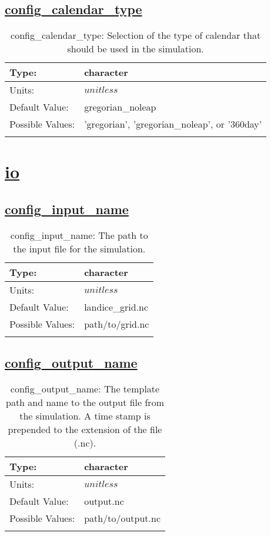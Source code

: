 \subsection[config\_calendar\_type]{\hyperref[sec:nm_tab_time_management]{config\_calendar\_type}}
\label{subsec:nm_sec_config_calendar_type}
\begin{center}
\begin{longtable}{| p{2.0in} | p{4.0in} |}
    \hline
    Type: & character \\
    \hline
    Units: & $unitless$ \\
    \hline
    Default Value: & gregorian\_noleap \\
    \hline
    Possible Values: & 'gregorian', 'gregorian\_noleap', or '360day' \\
    \hline
    \caption{config\_calendar\_type: Selection of the type of calendar that should be used in the simulation.}
\end{longtable}
\end{center}
\section[io]{\hyperref[sec:nm_tab_io]{io}}
\label{sec:nm_sec_io}
\subsection[config\_input\_name]{\hyperref[sec:nm_tab_io]{config\_input\_name}}
\label{subsec:nm_sec_config_input_name}
\begin{center}
\begin{longtable}{| p{2.0in} | p{4.0in} |}
    \hline
    Type: & character \\
    \hline
    Units: & $unitless$ \\
    \hline
    Default Value: & landice\_grid.nc \\
    \hline
    Possible Values: & path/to/grid.nc \\
    \hline
    \caption{config\_input\_name: The path to the input file for the simulation.}
\end{longtable}
\end{center}
\subsection[config\_output\_name]{\hyperref[sec:nm_tab_io]{config\_output\_name}}
\label{subsec:nm_sec_config_output_name}
\begin{center}
\begin{longtable}{| p{2.0in} | p{4.0in} |}
    \hline
    Type: & character \\
    \hline
    Units: & $unitless$ \\
    \hline
    Default Value: & output.nc \\
    \hline
    Possible Values: & path/to/output.nc \\
    \hline
    \caption{config\_output\_name: The template path and name to the output file from the simulation. A time stamp is prepended to the extension of the file (.nc).}
\end{longtable}
\end{center}
